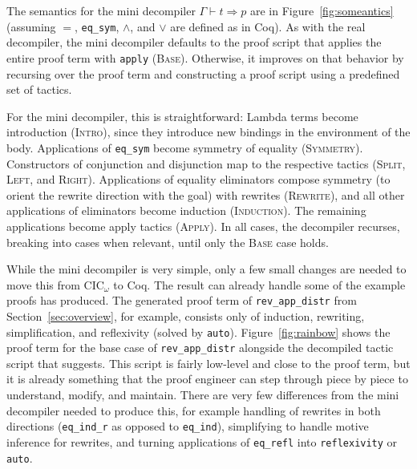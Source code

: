 The semantics for the mini decompiler $\Gamma \vdash t \Rightarrow p$ are in Figure~\ref{fig:someantics} (assuming $=$, \lstinline{eq_sym}, $\wedge$, and $\vee$ are defined as in Coq).
As with the real decompiler, the mini decompiler defaults to the proof script
that applies the entire proof term with \lstinline{apply} (\textsc{Base}).
Otherwise, it improves on that behavior by recursing over the proof term and constructing a proof script using a predefined set of tactics.

For the mini decompiler, this is straightforward: Lambda terms become introduction 	(\textsc{Intro}), since they introduce new bindings
in the environment of the body. Applications of \lstinline{eq_sym} become symmetry of equality (\textsc{Symmetry}).
Constructors of conjunction and disjunction map to the respective tactics (\textsc{Split}, \textsc{Left}, and \textsc{Right}).
Applications of equality eliminators compose symmetry (to orient the rewrite direction with the goal) with rewrites (\textsc{Rewrite}),
and all other applications of eliminators become induction (\textsc{Induction}).
The remaining applications become apply tactics (\textsc{Apply}).
In all cases, the decompiler recurses, breaking into cases when relevant, until only the \textsc{Base}
case holds. %

While the mini decompiler is very simple, only a few small changes are needed
to move this from CIC$_{\omega}$ to Coq.
The result can already handle some of the example proofs \toolname has produced.
The generated proof term of \lstinline{rev_app_distr} from Section~\ref{sec:overview},
for example, consists only of induction, rewriting, simplification, and reflexivity (solved by \lstinline{auto}).
Figure~\ref{fig:rainbow} shows the proof term for the base case of \lstinline{rev_app_distr} 
alongside the decompiled tactic script that \toolname suggests.
This script is fairly low-level and close to the proof term, but it is already something that the proof engineer
can step through piece by piece to understand, modify, and maintain.
There are very few differences from the mini decompiler needed to produce this,
for example handling of rewrites in both directions (\lstinline{eq_ind_r} as opposed to \lstinline{eq_ind}),
simplifying to handle motive inference for rewrites,
and turning applications of \lstinline{eq_refl} into \lstinline{reflexivity} or \lstinline{auto}.

